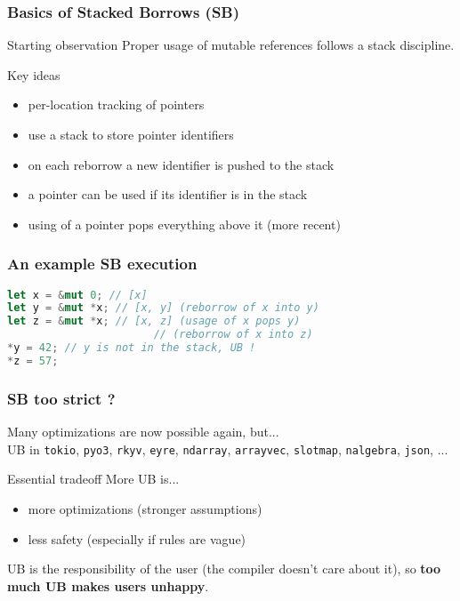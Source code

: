 \begin{frame}
    \frametitle{Basics of Stacked Borrows (SB)}
    \begin{block}{Starting observation}
        Proper usage of mutable references follows a stack discipline.
    \end{block}
    \begin{block}{Key ideas}
        \begin{itemize}
            \item per-location tracking of pointers
            \item use a stack to store pointer identifiers
            \item on each reborrow a new identifier is pushed to the stack
            \item a pointer can be used if its identifier is in the stack
            \item using of a pointer pops everything above it (more recent)
        \end{itemize}
    \end{block}
\end{frame}

\begin{frame}[fragile]
    \frametitle{An example SB execution}
    \begin{block}{}
        \begin{lstlisting}[language=rust]
let x = &mut 0; // [x]
let y = &mut *x; // [x, y] (reborrow of x into y)
let z = &mut *x; // [x, z] (usage of x pops y)
                       // (reborrow of x into z)
*y = 42; // y is not in the stack, UB !
*z = 57;
        \end{lstlisting}
    \end{block}
\end{frame}

\begin{frame}
    \frametitle{SB too strict ?}
    Many optimizations are now possible again, but...~\\

    UB in \texttt{tokio}, \texttt{pyo3}, \texttt{rkyv}, \texttt{eyre},
    \texttt{ndarray}, \texttt{arrayvec}, \texttt{slotmap}, \texttt{nalgebra},
    \texttt{json}, ...~\\

    \begin{block}{Essential tradeoff}
        More UB is...
        \begin{itemize}
            \item more optimizations (stronger assumptions)
            \item less safety (especially if rules are vague)
        \end{itemize}
    \end{block}
    \begin{block}{}
        UB is the responsibility of the user (the compiler doesn't care about it),
        so \textbf{too much UB makes users unhappy}.
    \end{block}
\end{frame}

